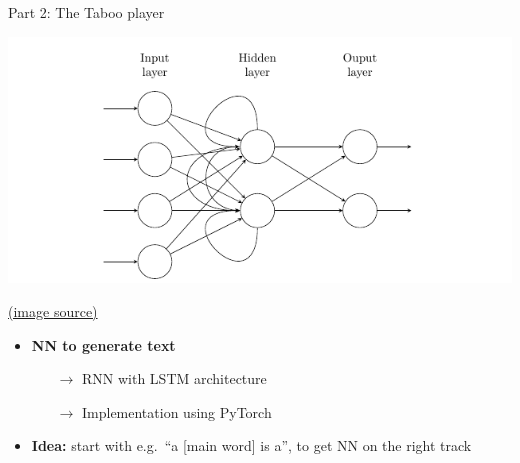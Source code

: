 \documentclass[11pt]{beamer}
\begin{document}


\begin{frame}{Part 2: The Taboo player}
	
\begin{center}
		\includegraphics[width=.75\linewidth]{rnn.png}
\end{center}

\hfill {\tiny \href{https://tex.stackexchange.com/questions/364413/drawing-an-unfolded-recurrent-neural-network}{(image source)} }
	
	\begin{itemize}
		\item \textbf{NN to generate text}
		\begin{itemize}
			\item[$\rightarrow$] RNN with LSTM architecture
			\item[$\rightarrow$] Implementation using PyTorch
		\end{itemize}
		\item \textbf{Idea:} start with e.g.\ ``a [main word] is a'', to get NN on the right track
	\end{itemize}
	
\end{frame}


%
%
%

\end{document}
